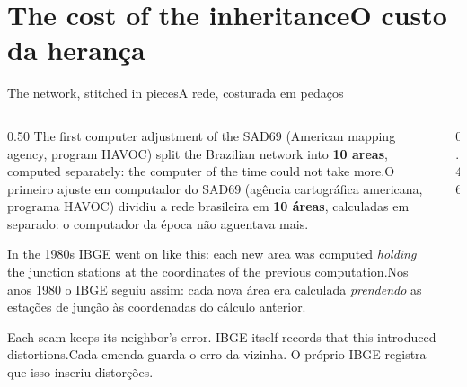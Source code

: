 \documentclass[aspectratio=169,11pt]{beamer}
\newcommand{\tr}[2]{\ifEN#2\else#1\fi}
\newcommand{\bnum}[1]{\ifmmode\textcolor{mTeal}{\mathbf{#1}}\else\textbf{\textcolor{mTeal}{#1}}\fi}
\begin{document}
\section{\tr{O custo da herança}{The cost of the inheritance}}

\begin{frame}{\tr{A rede, costurada em pedaços}{The network, stitched in pieces}}
  \begin{columns}[T]
    \begin{column}{0.50\textwidth}
      \small
      \tr{O primeiro ajuste em computador do SAD69 (agência cartográfica americana, programa
      HAVOC) dividiu a rede brasileira em \bnum{10 áreas}, calculadas em separado: o computador
      da época não aguentava mais.}{The first computer adjustment of the SAD69 (American mapping
      agency, program HAVOC) split the Brazilian network into \bnum{10 areas}, computed
      separately: the computer of the time could not take more.}
      \medskip

      \tr{Nos anos 1980 o IBGE seguiu assim: cada nova área era calculada \emph{prendendo} as
      estações de junção às coordenadas do cálculo anterior.}{In the 1980s IBGE went on like
      this: each new area was computed \emph{holding} the junction stations at the coordinates
      of the previous computation.}
      \medskip

      \tr{Cada emenda guarda o erro da vizinha. O próprio IBGE registra que isso
      \alert{inseriu distorções}.}{Each seam keeps its neighbor's error. IBGE itself records
      that this \alert{introduced distortions}.}
    \end{column}
    \begin{column}{0.46\textwidth}
      \centering
    \end{column}
  \end{columns}
\end{frame}
\end{document}
